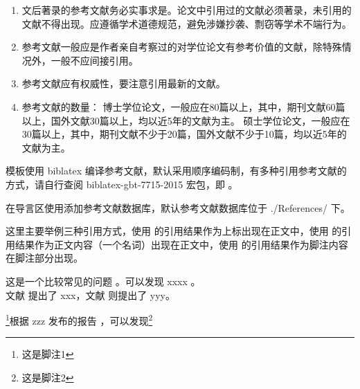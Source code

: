 \begin{tcolorbox}[colback=blue!5!white,colframe=blue!75!black]
  \begin{enumerate}[leftmargin=0.5cm]
    \item 文后著录的参考文献务必实事求是。论文中引用过的文献必须著录，未引用的文献不得出现。应遵循学术道德规范，避免涉嫌抄袭、剽窃等学术不端行为。
    \item 参考文献一般应是作者亲自考察过的对学位论文有参考价值的文献，除特殊情况外，一般不应间接引用。
    \item 参考文献应有权威性，要注意引用最新的文献。
    \item 参考文献的数量：
    博士学位论文，一般应在80篇以上，其中，期刊文献60篇以上，国外文献30篇以上，均以近5年的文献为主。
    硕士学位论文，一般应在30篇以上，其中，期刊文献不少于20篇，国外文献不少于10篇，均以近5年的文献为主。
  \end{enumerate}
\end{tcolorbox}

模板使用 biblatex 编译参考文献，默认采用顺序编码制，有多种引用参考文献的方式，请自行查阅 biblatex-gbt-7715-2015 宏包，即 。

在导言区使用\clist{}添加参考文献数据库，默认参考文献数据库位于 ./References/ 下。

这里主要举例三种引用方式，使用  的引用结果作为上标出现在正文中，使用  的引用结果作为正文内容（一个名词）出现在正文中，使用  的引用结果作为脚注内容在脚注部分出现。



\begin{texcode}[]{}
  这是一个比较常见的问题 \cite{barella_situ_2021}。可以发现 xxxx \cite{atta_enhanced_2021}。\\
  文献\parencite{张燕2013电气自动化在电气工程中的应用探讨} 提出了 xxx，文献 \parencite{黄雪芳2012探讨电气工程中自动化技术的应用} 则提出了 yyy。
\end{texcode}

\footnote{这是脚注1}根据 zzz 发布的报告 ，可以发现\footnote{这是脚注2}